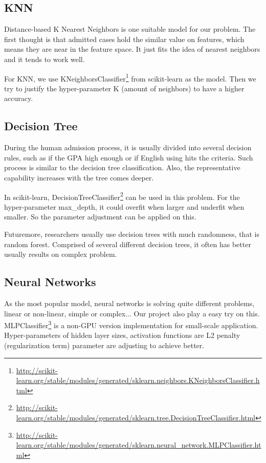 \documentclass{article}
\begin{document}
\subsection{KNN}

Distance-based K Nearest Neighbors is one suitable model for our problem. The first thought is that admitted cases hold the similar value on features, which means they are near in the feature space. It just fits the idea of nearest neighbors and it tends to work well.

For KNN, we use KNeighborsClassifier\footnote{\url{http://scikit-learn.org/stable/modules/generated/sklearn.neighbors.KNeighborsClassifier.html}} from scikit-learn as the model. Then we try to justify the hyper-parameter K (amount of neighbors) to have a higher accuracy.

\subsection{Decision Tree}

During the human admission process, it is usually divided into several decision rules, such as if the GPA high enough or if English using hits the criteria. Such process is similar to the decision tree classification. Also, the representative capability increases with the tree comes deeper.

In scikit-learn, DecisionTreeClassifier\footnote{\url{http://scikit-learn.org/stable/modules/generated/sklearn.tree.DecisionTreeClassifier.html}} can be used in this problem. For the hyper-parameter max\_depth, it could overfit when larger and underfit when smaller. So the parameter adjustment can be applied on this.

Futuremore, researchers usually use decision trees with much randomness, that is random forest. Comprised of several different decision trees, it often has better usually results on complex problem.

\subsection{Neural Networks}

As the most popular model, neural networks is solving quite different problems, linear or non-linear, simple or complex... Our project also play a easy try on this. MLPClassifier\footnote{\url{http://scikit-learn.org/stable/modules/generated/sklearn.neural_network.MLPClassifier.html}} is a non-GPU version implementation for small-scale application. Hyper-parameters of hidden layer sizes, activation functions are L2 penalty (regularization term) parameter are adjusting to achieve better.
\end{document}
